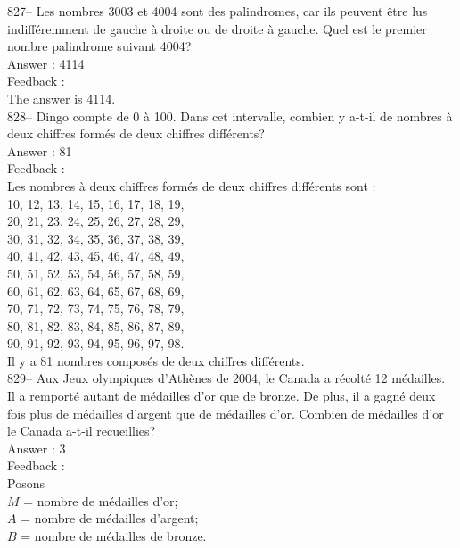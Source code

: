 \documentclass[letterpaper, 12pt]{article}
\begin{document}
827-- Les nombres 3003 et 4004 sont des palindromes, car ils peuvent \^etre
lus indiff\'eremment de gauche \`a droite ou de droite \`a gauche.  Quel est
le premier nombre palindrome suivant 4004?\\

Answer : 4114\\

Feedback :\\
The answer is 4114.\\

828-- Dingo compte de 0 \`a 100.  Dans cet intervalle, combien y a-t-il de
nombres \`a deux chiffres form\'es de deux chiffres diff\'erents?\\

Answer : 81\\

Feedback : \\
Les nombres \`a deux chiffres form\'es de deux chiffres diff\'erents sont :
\\
10, 12, 13, 14, 15, 16, 17, 18, 19, \\
20, 21, 23, 24, 25, 26, 27, 28, 29, \\
30, 31, 32, 34, 35, 36, 37, 38, 39, \\
40, 41, 42, 43, 45, 46, 47, 48, 49, \\
50, 51, 52, 53, 54, 56, 57, 58, 59, \\
60, 61, 62, 63, 64, 65, 67, 68, 69, \\
70, 71, 72, 73, 74, 75, 76, 78, 79, \\
80, 81, 82, 83, 84, 85, 86, 87, 89, \\
90, 91, 92, 93, 94, 95, 96, 97, 98. \\

Il y a 81 nombres compos\'es de deux chiffres diff\'erents.\\


829-- Aux Jeux olympiques d'Ath\`enes de 2004, le Canada a r\'ecolt\'e 12
m\'edailles.  Il a remport\'e autant de m\'edailles d'or que de bronze.  De
plus, il a gagn\'e  deux fois plus de m\'edailles d'argent que de
m\'edailles d'or.  Combien de m\'edailles d'or le Canada a-t-il
recueillies?\\

Answer : 3\\

Feedback : \\
Posons\\
$M$ = nombre de m\'edailles d'or;\\
$A$ = nombre de m\'edailles d'argent;\\
$B$ = nombre de m\'edailles de bronze.\\
\end{document}

